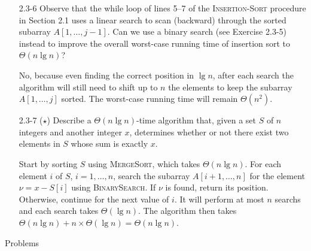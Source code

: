 \begin{enumerate}
\item[2.3{-}6]{Observe that the while loop of lines 5{--}7 of the
\textsc{Insertion-Sort} procedure in Section 2.1 uses a linear search to scan
(backward) through the sorted subarray $A[1, \dots, j - 1]$. Can we use a binary
search (see Exercise 2.3-5) instead to improve the overall worst-case running
time of insertion sort to $\Theta(n \lg n)$?}

\begin{framed}
No, because even finding the correct position in $\lg n$, after each search the
algorithm will still need to shift up to $n$ the elements to keep the subarray
$A[1, \dots, j]$ sorted. The worst-case running time will remain $\Theta(n^2)$.
\end{framed}

\item[2.3{-}7]{($\star$) Describe a $\Theta(n \lg n)$-time algorithm that, given a set
$S$ of $n$ integers and another integer $x$, determines whether or not there
exist two elements in $S$ whose sum is exactly $x$.}

\begin{framed}
Start by sorting $S$ using \textsc{MergeSort}, which takes $\Theta(n \lg n)$.
For each element $i$ of $S$, $i = 1, \dots, n$, search the subarray $A[i + 1,
\dots, n]$ for the element $\nu = x - S[i]$ using \textsc{BinarySearch}. If
$\nu$ is found, return its position. Otherwise, continue for the next value of
$i$. It will perform at most $n$ searchs and each search takes $\Theta(\lg n)$.
The algorithm then takes $\Theta(n \lg n) + n \times \Theta(\lg n) = \Theta(n
\lg n)$.
\end{framed}

\end{enumerate}

\pagebreak

{\large Problems}

